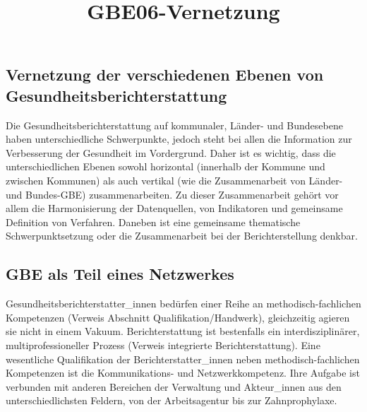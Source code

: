 \documentclass{article}
\begin{document}
\title{GBE06-Vernetzung}

\maketitle


\subsection{Vernetzung der verschiedenen Ebenen von Gesundheitsberichterstattung}\label{H2151291}



Die Gesundheitsberichterstattung auf kommunaler, Länder- und Bundesebene haben unterschiedliche Schwerpunkte, jedoch steht bei allen die Information zur Verbesserung der Gesundheit im Vordergrund. Daher ist es wichtig, dass die unterschiedlichen Ebenen sowohl horizontal  (innerhalb der Kommune und zwischen Kommunen) als auch vertikal (wie die Zusammenarbeit von Länder- und Bundes-GBE) zusammenarbeiten. Zu dieser Zusammenarbeit gehört vor allem die Harmonisierung der Datenquellen, von Indikatoren und gemeinsame Definition von Verfahren. Daneben ist eine gemeinsame thematische Schwerpunktsetzung oder die Zusammenarbeit bei der Berichterstellung denkbar.


\subsection{GBE als Teil eines Netzwerkes}\label{H5247316}



Gesundheitsberichterstatter\_innen bedürfen einer Reihe an methodisch-fachlichen Kompetenzen (Verweis Abschnitt Qualifikation/Handwerk), gleichzeitig agieren sie nicht in einem Vakuum. Berichterstattung ist bestenfalls ein interdisziplinärer, multiprofessioneller Prozess (Verweis integrierte Berichterstattung). Eine wesentliche Qualifikation der Berichterstatter\_innen neben methodisch-fachlichen Kompetenzen ist die Kommunikations- und Netzwerkkompetenz. Ihre Aufgabe ist verbunden mit anderen Bereichen der Verwaltung und Akteur\_innen aus den unterschiedlichsten Feldern, von der Arbeitsagentur bis zur Zahnprophylaxe. 
\end{document}
